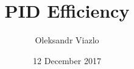 \documentclass[8pt]{beamer}
\newif\ifplacelogo %
\begin{document}
\newcommand{\backupbegin}{
   \newcounter{finalframe}
   \setcounter{finalframe}{\value{framenumber}}
}
\newcommand{\backupend}{
   \setcounter{framenumber}{\value{finalframe}}
}

\newcommand{\myNode}{\tikz[baseline,inner sep=1pt] \node[anchor=base]}



\title[ PID Efficiency \hspace{13.5em}\insertframenumber/
\inserttotalframenumber]{ PID Efficiency }


	\author[Oleksandr Viazlo]{Oleksandr Viazlo \\ 
	}
	
       
	\date{12 December 2017}


	

   	

\placelogofalse
\end{document}
